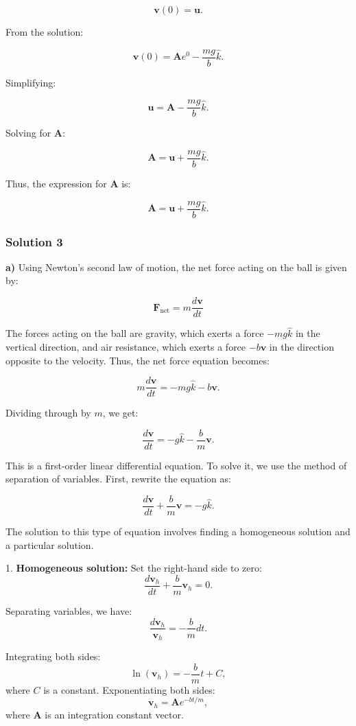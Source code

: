 \documentclass{article}
\begin{document}
\[
\mathbf{v}(0) = \mathbf{u}.
\]

From the solution:

\[
\mathbf{v}(0) = \mathbf{A} e^{0} - \frac{mg}{b} \hat{k}.
\]

Simplifying:

\[
\mathbf{u} = \mathbf{A} - \frac{mg}{b} \hat{k}.
\]

Solving for $\mathbf{A}$:

\[
\mathbf{A} = \mathbf{u} + \frac{mg}{b} \hat{k}.
\]

Thus, the expression for $\mathbf{A}$ is:

\[
\mathbf{A} = \mathbf{u} + \frac{mg}{b} \hat{k}.
\]

\subsubsection{Solution 3}
\textbf{a)} Using Newton's second law of motion, the net force acting on the ball is given by:

\[
\mathbf{F}_{\text{net}} = m \frac{d\mathbf{v}}{dt}
\]

The forces acting on the ball are gravity, which exerts a force $-mg\hat{k}$ in the vertical direction, and air resistance, which exerts a force $-b\mathbf{v}$ in the direction opposite to the velocity. Thus, the net force equation becomes:

\[
m \frac{d\mathbf{v}}{dt} = -mg\hat{k} - b\mathbf{v}.
\]

Dividing through by $m$, we get:

\[
\frac{d\mathbf{v}}{dt} = -g\hat{k} - \frac{b}{m} \mathbf{v}.
\]

This is a first-order linear differential equation. To solve it, we use the method of separation of variables. First, rewrite the equation as:

\[
\frac{d\mathbf{v}}{dt} + \frac{b}{m} \mathbf{v} = -g\hat{k}.
\]

The solution to this type of equation involves finding a homogeneous solution and a particular solution.

1. \textbf{Homogeneous solution:} Set the right-hand side to zero:
\[
\frac{d\mathbf{v}_h}{dt} + \frac{b}{m} \mathbf{v}_h = 0.
\]

Separating variables, we have:
\[
\frac{d\mathbf{v}_h}{\mathbf{v}_h} = -\frac{b}{m} dt.
\]

Integrating both sides:
\[
\ln(\mathbf{v}_h) = -\frac{b}{m}t + C,
\]
where $C$ is a constant. Exponentiating both sides:
\[
\mathbf{v}_h = \mathbf{A} e^{-bt/m},
\]
where $\mathbf{A}$ is an integration constant vector.
\end{document}
